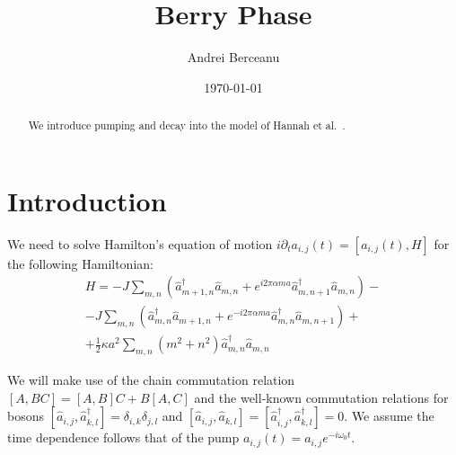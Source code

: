 \documentclass[a4paper,prb,10pt,aps,twocolumn]{revtex4-1}
\begin{document}
\title{Berry Phase}
\author{Andrei Berceanu}

\date{\today}

\begin{abstract}
We introduce pumping and decay into the model of Hannah et al.~\cite{1403.6041v2}.
\end{abstract}

\maketitle

\section{Introduction}
We need to solve Hamilton's equation of motion $i\partial_{t}a_{i,j}(t)=\left[a_{i,j}(t),H\right]$ for the following Hamiltonian:\cite{1403.6041v2} 
\begin{multline}
  \label{eq:1}
H=-J\sum_{m,n}(\hat{a}_{m+1,n}^{\dagger}\hat{a}_{m,n}+e^{i2\pi\alpha ma}\hat{a}_{m,n+1}^{\dagger}\hat{a}_{m,n})-\\-J\sum_{m,n}(\hat{a}_{m,n}^{\dagger}\hat{a}_{m+1,n}+e^{-i2\pi\alpha ma}\hat{a}_{m,n}^{\dagger}\hat{a}_{m,n+1})+\\+\frac{1}{2}\kappa a^{2}\sum_{m,n}(m^{2}+n^{2})\hat{a}_{m,n}^{\dagger}\hat{a}_{m,n}
\end{multline}


We will make use of the chain commutation relation $\left[A,BC\right]=\left[A,B\right]C+B\left[A,C\right]$ and the well-known commutation relations for bosons $\left[\hat{a}_{i,j},\hat{a}_{k,l}^{\dagger}\right]=\delta_{i,k}\delta_{j,l}$ and $\left[\hat{a}_{i,j},\hat{a}_{k,l}\right]=\left[\hat{a}_{i,j}^{\dagger},\hat{a}_{k,l}^{\dagger}\right]=0$. We assume the time dependence follows that of the pump $a_{i,j}(t)=a_{i,j}e^{-i\omega_{0}t}$.
\end{document}
